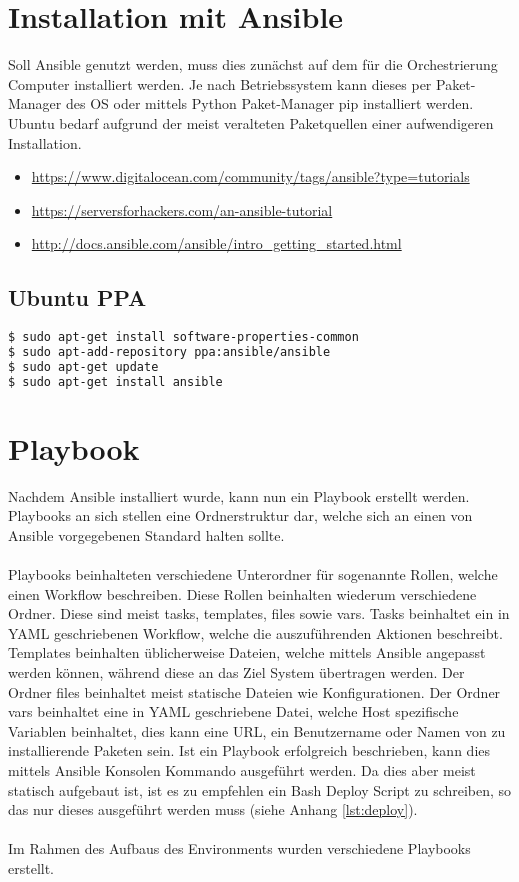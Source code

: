 \section{Installation mit Ansible}
Soll Ansible genutzt werden, muss dies zunächst auf dem für die Orchestrierung Computer installiert werden. Je nach Betriebssystem kann dieses per Paket-Manager des OS oder mittels Python Paket-Manager pip installiert werden. Ubuntu bedarf aufgrund der meist veralteten Paketquellen einer aufwendigeren Installation.
\begin{itemize}
  \item \url{https://www.digitalocean.com/community/tags/ansible?type=tutorials}
  \item \url{https://serversforhackers.com/an-ansible-tutorial}
  \item \url{http://docs.ansible.com/ansible/intro_getting_started.html}
\end{itemize}

\subsection{Ubuntu PPA}
\begin{lstlisting}[language=bash]
$ sudo apt-get install software-properties-common
$ sudo apt-add-repository ppa:ansible/ansible
$ sudo apt-get update
$ sudo apt-get install ansible
\end{lstlisting}

\newpage
\section{Playbook}
Nachdem Ansible installiert wurde, kann nun ein Playbook erstellt werden.
Playbooks an sich stellen eine Ordnerstruktur dar, welche sich an einen von Ansible vorgegebenen Standard halten sollte. \cite{ansibledirectory}
\\\\
Playbooks beinhalteten verschiedene Unterordner für sogenannte Rollen, welche einen Workflow beschreiben.
Diese Rollen beinhalten wiederum verschiedene Ordner. Diese sind meist tasks, templates, files sowie vars. Tasks beinhaltet ein in YAML geschriebenen Workflow, welche die auszuführenden Aktionen beschreibt. Templates beinhalten üblicherweise Dateien, welche mittels Ansible angepasst werden können, während diese an das Ziel System übertragen werden. Der Ordner files beinhaltet meist statische Dateien wie Konfigurationen. Der Ordner vars beinhaltet eine in YAML geschriebene Datei, welche Host spezifische Variablen beinhaltet, dies kann eine URL, ein Benutzername oder Namen von zu installierende Paketen sein.
Ist ein Playbook erfolgreich beschrieben, kann dies mittels Ansible Konsolen Kommando ausgeführt werden. Da dies aber meist statisch aufgebaut ist, ist es zu empfehlen ein Bash Deploy Script zu schreiben, so das nur dieses ausgeführt werden muss (siehe Anhang \ref{lst:deploy}).
\\\\
Im Rahmen des Aufbaus des Environments wurden verschiedene Playbooks erstellt.
